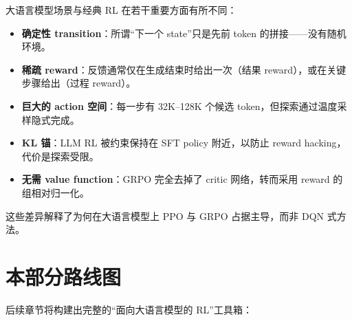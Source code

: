 \begin{intuitionbox}
大语言模型场景与经典 RL 在若干重要方面有所不同：

\begin{itemize}
  \item \textbf{确定性 transition}：所谓“下一个 state”只是先前 token 的拼接——没有随机环境。
  \item \textbf{稀疏 reward}：反馈通常仅在生成结束时给出一次（结果 reward），或在关键步骤给出（过程 reward）。
  \item \textbf{巨大的 action 空间}：每一步有 32K--128K 个候选 token，但探索通过温度采样隐式完成。
  \item \textbf{KL 锚}：LLM RL 被约束保持在 SFT policy 附近，以防止 reward hacking，代价是探索受限。
  \item \textbf{无需 value function}：GRPO 完全去掉了 critic 网络，转而采用 reward 的组相对归一化。
\end{itemize}

这些差异解释了为何在大语言模型上 PPO 与 GRPO 占据主导，而非 DQN 式方法。
\end{intuitionbox}

\section{本部分路线图}
\label{what-this-part-covers}

后续章节将构建出完整的“面向大语言模型的 RL”工具箱：


